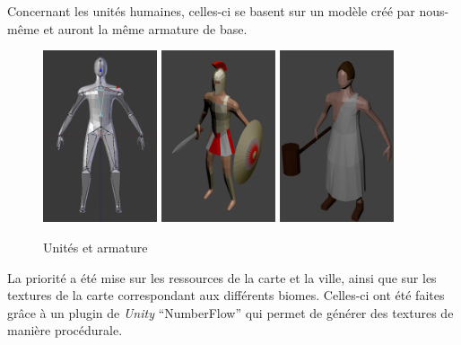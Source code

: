 \documentclass[12pt]{report}
\begin{document}
Concernant les unités humaines, celles-ci se basent sur un modèle créé par nous-même et auront la même armature de base.

\begin{figure}[H]
    \centering
    \includegraphics[width=0.3\textwidth]{RefUnitWthArmature}
    \includegraphics[width=0.3\textwidth]{Swordmen}
    \includegraphics[width=0.3\textwidth]{Worker}
    \caption{Unités et armature}
\end{figure}

La priorité a été mise sur les ressources de la carte et la ville, ainsi que sur les textures de la carte correspondant aux différents biomes. Celles-ci ont été faites grâce à un plugin de \textit{Unity} “NumberFlow” qui permet de générer des textures de manière procédurale.
\end{document}
